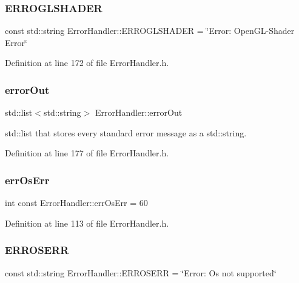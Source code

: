 \subsubsection{\texorpdfstring{ERROGLSHADER}{ERROGLSHADER}}
{\footnotesize\ttfamily const std\+::string Error\+Handler\+::\+E\+R\+R\+O\+G\+L\+S\+H\+A\+D\+ER = \char`\"{}Error\+: Open\+GL-\/Shader Error\char`\"{}\hspace{0.3cm}{\ttfamily [static]}}



Definition at line 172 of file Error\+Handler.\+h.

\mbox{\label{classErrorHandler_aeb3bff116fcb83a58defbef8e8111f0e}} 
\subsubsection{\texorpdfstring{errorOut}{errorOut}}
{\footnotesize\ttfamily std\+::list$<$std\+::string$>$ Error\+Handler\+::error\+Out\hspace{0.3cm}{\ttfamily [private]}}

std\+::list that stores every standard error message as a std\+::string. 

Definition at line 177 of file Error\+Handler.\+h.

\mbox{\label{classErrorHandler_ab216b4dc48424850bdf52da2f4273023}} 
\subsubsection{\texorpdfstring{errOsErr}{errOsErr}}
{\footnotesize\ttfamily int const Error\+Handler\+::err\+Os\+Err = 60\hspace{0.3cm}{\ttfamily [static]}}



Definition at line 113 of file Error\+Handler.\+h.

\mbox{\label{classErrorHandler_addc0430f69f200c95ae36b23cd0d10a6}} 
\subsubsection{\texorpdfstring{ERROSERR}{ERROSERR}}
{\footnotesize\ttfamily const std\+::string Error\+Handler\+::\+E\+R\+R\+O\+S\+E\+RR = \char`\"{}Error\+: Os not supported\char`\"{}\hspace{0.3cm}{\ttfamily [static]}}




